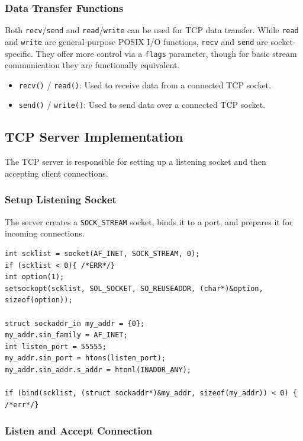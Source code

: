 \documentclass{article}
\begin{document}
\subsubsection{Data Transfer Functions}

Both \texttt{recv}/\texttt{send} and \texttt{read}/\texttt{write} can be used for TCP data transfer. While \texttt{read} and \texttt{write} are general-purpose POSIX I/O functions, \texttt{recv} and \texttt{send} are socket-specific. They offer more control via a \texttt{flags} parameter, though for basic stream communication they are functionally equivalent.

\begin{itemize}
    \item \texttt{recv()} / \texttt{read()}: Used to receive data from a connected TCP socket.
    \item \texttt{send()} / \texttt{write()}: Used to send data over a connected TCP socket.
\end{itemize}

\subsection{TCP Server Implementation}

The TCP server is responsible for setting up a listening socket and then accepting client connections.

\subsubsection{Setup Listening Socket}

The server creates a \texttt{SOCK\_STREAM} socket, binds it to a port, and prepares it for incoming connections.

\begin{verbatim}
int scklist = socket(AF_INET, SOCK_STREAM, 0);
if (scklist < 0){ /*ERR*/}
int option(1);
setsockopt(scklist, SOL_SOCKET, SO_REUSEADDR, (char*)&option, sizeof(option));

struct sockaddr_in my_addr = {0};
my_addr.sin_family = AF_INET;
int listen_port = 55555;
my_addr.sin_port = htons(listen_port);
my_addr.sin_addr.s_addr = htonl(INADDR_ANY);

if (bind(scklist, (struct sockaddr*)&my_addr, sizeof(my_addr)) < 0) { /*err*/}
\end{verbatim}

\subsubsection{Listen and Accept Connection}
\end{document}
